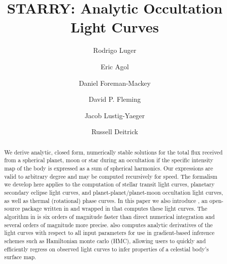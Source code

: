 \documentclass[modern]{aastex61}
\begin{document}

\setlength{\abovedisplayskip}{1.5em}
\setlength{\belowdisplayskip}{1.5em}

\title{%
    \textbf{STARRY}: Analytic Occultation Light Curves
}

\author[0000-0002-0296-3826]{Rodrigo Luger}
%
\author{Eric Agol}
%
\author{Daniel Foreman-Mackey}
%
\author{David P. Fleming}
%
\author{Jacob Lustig-Yaeger}
%
\author{Russell Deitrick}


\begin{abstract}
We derive analytic, closed form, numerically stable solutions for the total flux
received from a spherical planet, moon or star during an occultation
if the specific intensity map of the body is expressed as a
sum of spherical harmonics. Our expressions are valid to arbitrary degree
and may be computed recursively for speed. The formalism we develop
here applies to the computation of stellar transit light curves,
planetary secondary eclipse light curves, and planet-planet/planet-moon
occultation light curves, as well as thermal (rotational) phase curves.
In this paper we also introduce \starry, an open-source package written in \cpp
and wrapped in \Python that computes these light curves.
The algorithm in \starry is six orders of magnitude faster than direct
numerical integration and several orders of magnitude more precise.
\starry also computes analytic derivatives of the light curves with respect to all input
parameters for use in gradient-based inference schemes such as
Hamiltonian monte carlo (HMC), allowing users to quickly and efficiently
regress on observed light curves to infer properties of a celestial body's
surface map.
\end{abstract}
\end{document}

